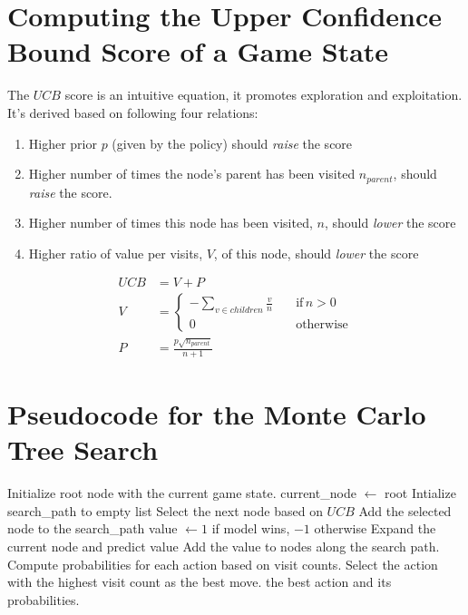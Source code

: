 \clearpage
\setcounter{page}{1}
\maketitlesupplementary



\section{Computing the Upper Confidence Bound Score of a Game State}
\label{sec:ucb_score}
The $UCB$ score is an intuitive equation, it promotes exploration and exploitation. It's derived based on following four relations:
\begin{enumerate}
  \item Higher prior $p$ (given by the policy) should \emph{raise} the score
  \item Higher number of times the node's parent has been visited $n_{parent}$, should \emph{raise} the score.
  \item Higher number of times this node has been visited, $n$, should \emph{lower} the score
  \item Higher ratio of value per visits, $V$, of this node, should \emph{lower} the score
\end{enumerate}
\begin{align}
  UCB &= V + P \\
  V &= \begin{cases}
    -\sum_{v\in children} \frac{v}{n} &\quad \text{if} \, n > 0 \\
    0 &\quad \text{otherwise}
  \end{cases} \\
  P &= \frac{p\sqrt{n_{parent}}}{n + 1}
\end{align}

\section{Pseudocode for the Monte Carlo Tree Search}
\label{sec:mcts_code}

\begin{algorithm}[h]
  \caption{Monte Carlo Tree Search (MCTS)}
  \label{alg:mcts}
  \begin{algorithmic}[1]
  \State Initialize root node with the current game state.
      \State current\_node $\gets$ root
      \State Intialize search\_path to empty list
          \State Select the next node based on $UCB$
          \State Add the selected node to the search\_path
      \EndWhile
          \State value $\gets 1$ if model wins, $-1$ otherwise
      \Else
          \State Expand the current node and predict value
      \EndIf
      \State Add the value to nodes along the search path.
  \EndFor
  \State Compute probabilities for each action based on visit counts.
  \State Select the action with the highest visit count as the best move.
  \State \Return the best action and its probabilities.
  \EndFunction
  \end{algorithmic}
  \end{algorithm}

